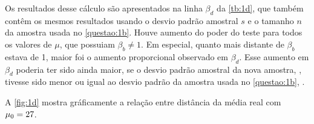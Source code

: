 \inputminted{r}{questao1/d-2.R}

Os resultados desse cálculo são apresentados na linha $\beta_d$ da \autoref{tb:1d}, que também contêm os mesmos resultados usando o desvio padrão amostral $s$ e o tamanho $n$ da amostra usada no \autoref{questao:1b}. Houve aumento do poder do teste para todos os valores de $\mu$, que possuiam $\beta_b \neq 1$. Em especial, quanto mais distante de $\beta_b$ estava de 1, maior foi o aumento proporcional observado em $\beta_d$. Esse aumento em $\beta_d$ poderia ter sido ainda maior, se o desvio padrão amostral da nova amostra, \UMDs, tivesse sido menor ou igual ao desvio padrão da amostra usada no \autoref{questao:1b}, \UMAs.

A \autoref{fig:1d} mostra gráficamente a relação entre distância da média real com $\mu_0 = \UMAu0$.





